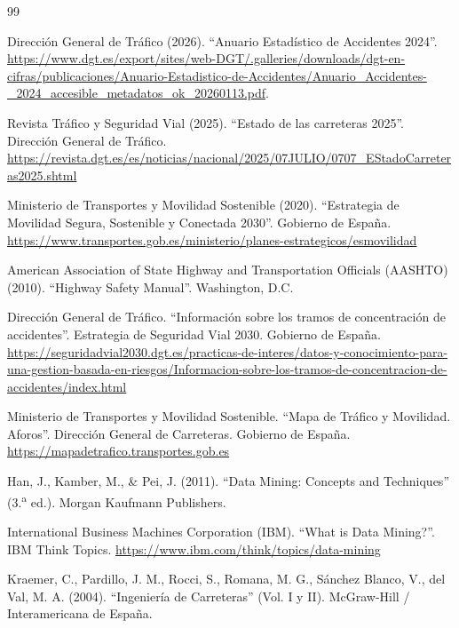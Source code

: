 \documentclass[twoside,a4paper,12pt,onecolumn,openany]{book}
\begin{document}
\begin{thebibliography}{99} %
%
%

 Dirección General de Tráfico (2026). ``Anuario Estadístico de Accidentes 2024''. \url{https://www.dgt.es/export/sites/web-DGT/.galleries/downloads/dgt-en-cifras/publicaciones/Anuario-Estadistico-de-Accidentes/Anuario_Accidentes-_2024_accesible_metadatos_ok_20260113.pdf}.

 Revista Tráfico y Seguridad Vial (2025). ``Estado de las carreteras 2025''. Dirección General de Tráfico. \url{https://revista.dgt.es/es/noticias/nacional/2025/07JULIO/0707_EStadoCarreteras2025.shtml}

 Ministerio de Transportes y Movilidad Sostenible (2020). ``Estrategia de Movilidad Segura, Sostenible y Conectada 2030''. Gobierno de España. \url{https://www.transportes.gob.es/ministerio/planes-estrategicos/esmovilidad}

 American Association of State Highway and Transportation Officials (AASHTO) (2010). ``Highway Safety Manual''. Washington, D.C.

 Dirección General de Tráfico. ``Información sobre los tramos de concentración de accidentes''. Estrategia de Seguridad Vial 2030. Gobierno de España. \url{https://seguridadvial2030.dgt.es/practicas-de-interes/datos-y-conocimiento-para-una-gestion-basada-en-riesgos/Informacion-sobre-los-tramos-de-concentracion-de-accidentes/index.html}

 Ministerio de Transportes y Movilidad Sostenible. ``Mapa de Tráfico y Movilidad. Aforos''. Dirección General de Carreteras. Gobierno de España. \url{https://mapadetrafico.transportes.gob.es}

 Han, J., Kamber, M., \& Pei, J. (2011). ``Data Mining: Concepts and Techniques'' (3.\textsuperscript{a} ed.). Morgan Kaufmann Publishers.

 International Business Machines Corporation (IBM). ``What is Data Mining?''. IBM Think Topics. \url{https://www.ibm.com/think/topics/data-mining}

 Kraemer, C., Pardillo, J. M., Rocci, S., Romana, M. G., Sánchez Blanco, V.,  del Val, M. A. (2004). ``Ingeniería de Carreteras'' (Vol. I y II). McGraw-Hill / Interamericana de España.


\end{thebibliography}
\end{document}
